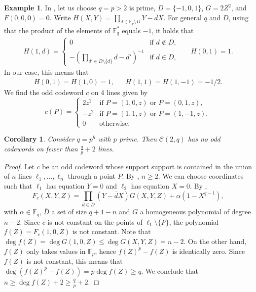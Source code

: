 \documentclass[12pt, a4paper]{article}
\newtheorem{crl}[thm]{Corollary}
\theoremstyle{definition}
\newtheorem{ex}[thm]{Example}
\newcommand{\FF}{\mathbb F}
\newcommand{\mc}{\mathcal C}
\begin{document}
\begin{ex}
 \label{Ex:OddOn4}
 In , let us choose $q = p > 2$ is prime, $D = \{-1,0,1\}$, $G = 2Z^2$, and $F(0,0,0) = 0$.
 Write $H(X,Y) = \prod_{\overline d \in \FF_q \setminus D} Y - \overline d X$.
 For general $q$ and $D$, using that the product of the elements of $\FF_q^*$ equals $-1$, it holds that
 \begin{align*}
  H(1,d) = \begin{cases}
   0 & \text{if } d \notin D, \\
   -\left( \prod_{d' \in D \setminus \{d\}} d - d' \right)^{-1} & \text{if } d \in D, 
  \end{cases} &&
   H(0,1) = 1.
 \end{align*}
 In our case, this means that
 \begin{align*}
  H(0,1) = H(1,0) = 1, && H(1,1) = H(1,-1) = -1/2.
 \end{align*}
 We find the odd codeword $c$ on 4 lines given by
 \[
  c(P) = \begin{cases}
   2 z^2 & \text{if $P = (1,0,z)$ or $P=(0,1,z)$}, \\
   - z^2 & \text{if $P = (1,1,z)$ or $P = (1,-1,z)$}, \\
   0 & \text{otherwise}.
  \end{cases}
 \]
\end{ex}

\begin{crl}
 \label{Crl:q/p+2}
 Consider $q = p^h$ with $p$ prime.
 Then $\mc(2,q)$ has no odd codewords on fewer than $\frac q p + 2$ lines.
\end{crl}

\begin{proof}
 Let $c$ be an odd codeword whose support support is contained in the union of $n$ lines $\ell_1, \dots, \ell_n$ through a point $P$.
 By , $n \geq 2$.
 We can choose coordinates such that $\ell_1$ has equation $Y=0$ and $\ell_2$ has equation $X=0$.
 By ,
 \[
 F_c(X,Y,Z) = \prod_{\overline d \in \overline D}(Y-\overline d X) G(X,Y,Z) + \alpha (1-X^{q-1}), 
 \]
 with $\alpha \in \FF_q$, $\overline D$ a set of size $q+1-n$ and $G$ a homogeneous polynomial of degree $n-2$.
 Since $c$ is not constant on the points of $\ell_1 \setminus \{P\}$, the polynomial $f(Z) = F_c(1,0,Z)$ is not constant.
 Note that $\deg f(Z) = \deg G(1,0,Z) \leq \deg G(X,Y,Z) = n-2$.
 On the other hand, $f(Z)$ only takes values in $\FF_p$, hence $f(Z)^p - f(Z)$ is identically zero.
 Since $f(Z)$ is not constant, this means that $\deg(f(Z)^p - f(Z)) = p \deg f(Z) \geq q$.
 We conclude that $n \geq \deg f(Z) + 2 \geq \frac q p + 2$.
\end{proof}
\end{document}
